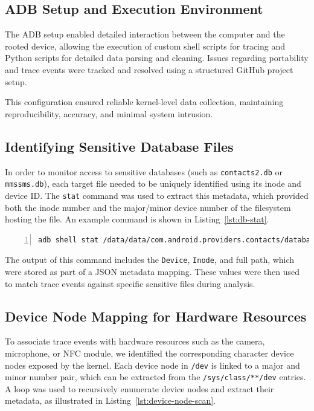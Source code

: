 \documentclass[a4paper,12pt]{report}
\begin{document}
\subsection{ADB Setup and Execution Environment}

The ADB setup enabled detailed interaction between the computer and the rooted device, allowing the execution of custom shell scripts for tracing and Python scripts for detailed data parsing and cleaning. Issues regarding portability and trace events were tracked and resolved using a structured GitHub project setup.

This configuration ensured reliable kernel-level data collection, maintaining reproducibility, accuracy, and minimal system intrusion.

\subsection{Identifying Sensitive Database Files}

In order to monitor access to sensitive databases (such as \texttt{contacts2.db} or \texttt{mmssms.db}), each target file needed to be uniquely identified using its inode and device ID. The \texttt{stat} command was used to extract this metadata, which provided both the inode number and the major/minor device number of the filesystem hosting the file. An example command is shown in Listing~\ref{lst:db-stat}.

\begin{lstlisting}[language=sh,caption={Retrieving inode and device ID for a database file},label={lst:db-stat},numbers=left]
adb shell stat /data/data/com.android.providers.contacts/databases/contacts2.db
\end{lstlisting}

The output of this command includes the \texttt{Device}, \texttt{Inode}, and full path, which were stored as part of a JSON metadata mapping. These values were then used to match trace events against specific sensitive files during analysis.

\subsection{Device Node Mapping for Hardware Resources}

To associate trace events with hardware resources such as the camera, microphone, or NFC module, we identified the corresponding character device nodes exposed by the kernel. Each device node in \texttt{/dev} is linked to a major and minor number pair, which can be extracted from the \texttt{/sys/class/**/dev} entries. A loop was used to recursively enumerate device nodes and extract their metadata, as illustrated in Listing~\ref{lst:device-node-scan}.
\end{document}
